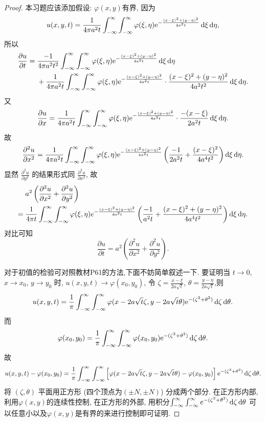 \begin{proof}
  本习题应该添加假设: $\varphi(x,y)$有界, 因为
  \[u(x,y,t) = \frac{1}{4\pi a^2t}\int_{-\infty}^{\infty}
    \int_{-\infty}^{\infty}\varphi(\xi,\eta)
      \mathrm{e}^{-\frac{(x-\xi)^2+(y-\eta)^2}{4a^2t}}\mathop{}\!\mathrm{d}\xi\mathop{}\!\mathrm{d}\eta,\]
  所以
  \[\begin{split}
    \frac{\partial u}{\partial t}
    ={} & \frac{-1}{4\pi a^2t^2}\int_{-\infty}^{\infty}\int_{-\infty}^{\infty}
      \varphi(\xi,\eta) \mathrm{e}^{-\frac{(x-\xi)^2+(y-\eta)^2}{4a^2t}}\mathop{}\!\mathrm{d}\xi\mathop{}\!\mathrm{d}\eta \\
        & + \frac{1}{4\pi a^2t}\int_{-\infty}^{\infty}\int_{-\infty}^{\infty}
          \varphi(\xi,\eta) \mathrm{e}^{-\frac{(x-\xi)^2+(y-\eta)^2}{4a^2t}}
          \cdot\frac{(x-\xi)^2+(y-\eta)^2}{4a^2t^2}\mathop{}\!\mathrm{d}\xi\mathop{}\!\mathrm{d}\eta.
  \end{split}\]
  又
  \[\frac{\partial u}{\partial x} = 
    \frac{1}{4\pi a^2t}\int_{-\infty}^{\infty}\int_{-\infty}^{\infty}
    \varphi(\xi,\eta) \mathrm{e}^{-\frac{(x-\xi)^2+(y-\eta)^2}{4a^2t}}
    \cdot\frac{-(x-\xi)}{2a^2t}\mathop{}\!\mathrm{d}\xi\mathop{}\!\mathrm{d}\eta.\]
  故
  \[\frac{\partial^2u}{\partial x^2} =
    \frac{1}{4\pi a^2t}\int_{-\infty}^{\infty}\int_{-\infty}^{\infty}
    \varphi(\xi,\eta) \mathrm{e}^{-\frac{(x-\xi)^2+(y-\eta)^2}{4a^2t}}
    \left(\frac{-1}{2a^2t} + \frac{(x-\xi)^2}{4a^4t^2}\right) \mathop{}\!\mathrm{d}\xi\mathop{}\!\mathrm{d}\eta.\]
  显然 $\frac{\partial^2u}{\partial y^2}$ 的结果形式同 $\frac{\partial^2u}{\partial x^2}$, 故
  \begin{align*}
    & a^2\left(\frac{\partial^2u}{\partial x^2}+\frac{\partial^2u}{\partial y^2}\right) \\
    ={} & \frac{1}{4\pi t}\int_{-\infty}^{\infty}\int_{-\infty}^{\infty}
          \varphi(\xi,\eta) e^{-\frac{(x-\xi)^2+(y-\eta)^2}{4a^2t}}
          \left(\frac{-1}{a^2t}+\frac{(x-\xi)^2+(y-\eta)^2}{4a^4t^2}\right)\mathop{}\!\mathrm{d}\xi\mathop{}\!\mathrm{d}\eta.
  \end{align*}
  对比可知
  \[\frac{\partial u}{\partial t}
    = a^2\left(\frac{\partial^2u}{\partial x^2}+\frac{\partial^2u}{\partial y^2}\right).\]
  
  对于初值的检验可对照教材P61的方法,下面不妨简单叙述一下.
  要证明当 $t\to 0$, $x\to x_0$, $y\to y_0$ 时,
  $u(x,y,t)\to\varphi(x_0,y_0)$, 令 $\zeta=\frac{x-\xi}{2a\sqrt{t}}$,
  $\theta=\frac{y-\eta}{2a\sqrt{t}}$,则
  \[u(x,y,t) =
    \frac{1}{\pi}\int_{-\infty}^{\infty}\int_{-\infty}^{\infty}
    \varphi(x-2a\sqrt{t}\zeta,y-2a\sqrt{t}\theta) \mathrm{e}^{-(\zeta^2+\theta^2)}
    \mathop{}\!\mathrm{d}\zeta\mathop{}\!\mathrm{d}\theta.\]
  而
  \[\varphi(x_0,y_0) =
    \frac{1}{\pi}\int_{-\infty}^{\infty}\int_{-\infty}^{\infty}
    \varphi(x_0,y_0) \mathrm{e}^{-(\zeta^2+\theta^2)} \mathop{}\!\mathrm{d}\zeta\mathop{}\!\mathrm{d}\theta.\]
  故
  \[u(x,y,t) - \varphi(x_0,y_0) =
    \frac{1}{\pi} \int_{-\infty}^{\infty}\int_{-\infty}^{\infty}
    \left[\varphi(x-2a\sqrt{t}\zeta,y-2a\sqrt{t}\theta)-\varphi(x_0,y_0)\right]
    \mathrm{e}^{-(\zeta^2+\theta^2)}\mathop{}\!\mathrm{d}\zeta\mathop{}\!\mathrm{d}\theta.\]
  将 $(\zeta,\theta)$ 平面用正方形 (四个顶点为$(\pm N,\pm N)$) 分成两个部分.
  在正方形内部, 利用$\varphi(x,y)$的连续性控制, 在正方形的外部,
  用积分$\int_{-\infty}^{\infty}\int_{-\infty}^{\infty}e^{-(\zeta^2+\theta^2)}\mathop{}\!\mathrm{d}\zeta\mathop{}\!\mathrm{d}\theta$ 可以任意小以及$\varphi(x,y)$是有界的来进行控制即可证明.
\end{proof}


